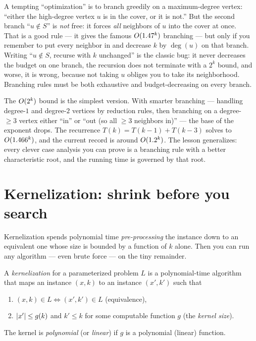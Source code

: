 \begin{trapbox}
A tempting ``optimization'' is to branch greedily on a maximum-degree vertex: ``either the high-degree vertex $u$ is in the cover, or it is not.'' But the second branch ``$u\notin S$'' is \emph{not} free: it forces \emph{all} neighbors of $u$ into the cover at once. That is a good rule --- it gives the famous $O(1.47^k)$ branching --- but only if you remember to put every neighbor in and decrease $k$ by $\deg(u)$ on that branch. Writing ``$u\notin S$, recurse with $k$ unchanged'' is the classic bug: it never decreases the budget on one branch, the recursion does not terminate with a $2^k$ bound, and worse, it is wrong, because not taking $u$ obliges you to take its neighborhood. Branching rules must be both exhaustive and budget-decreasing on every branch.
\end{trapbox}

\begin{aestheticbox}
The $O(2^k)$ bound is the simplest version. With smarter branching --- handling degree-$1$ and degree-$2$ vertices by reduction rules, then branching on a degree-$\ge 3$ vertex either ``in'' or ``out (so all $\ge 3$ neighbors in)'' --- the base of the exponent drops. The recurrence $T(k)=T(k-1)+T(k-3)$ solves to $O(1.466^k)$, and the current record is around $O(1.2^k)$. The lesson generalizes: every clever case analysis you can prove is a branching rule with a better characteristic root, and the running time is governed by that root.
\end{aestheticbox}

\section{Kernelization: shrink before you search}

Kernelization spends polynomial time \emph{pre-processing} the instance down to an equivalent one whose size is bounded by a function of $k$ alone. Then you can run any algorithm --- even brute force --- on the tiny remainder.

\begin{definition}[Kernel]\label{ch25:def-kernel}
A \emph{kernelization} for a parameterized problem $L$ is a polynomial-time algorithm that maps an instance $(x,k)$ to an instance $(x',k')$ such that
\begin{enumerate}
  \item $(x,k)\in L \iff (x',k')\in L$ (equivalence),
  \item $\lvert x'\rvert\le g(k)$ and $k'\le k$ for some computable function $g$ (the \emph{kernel size}).
\end{enumerate}
The kernel is \emph{polynomial} (or \emph{linear}) if $g$ is a polynomial (linear) function.
\end{definition}

